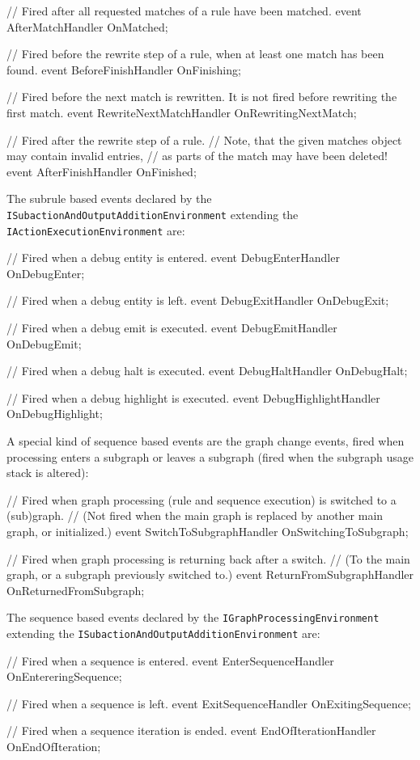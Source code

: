 \begin{csharplet}
// Fired after all requested matches of a rule have been matched.
event AfterMatchHandler OnMatched;

// Fired before the rewrite step of a rule, when at least one match has been found.
event BeforeFinishHandler OnFinishing;

// Fired before the next match is rewritten. It is not fired before rewriting the first match.
event RewriteNextMatchHandler OnRewritingNextMatch;

// Fired after the rewrite step of a rule.
// Note, that the given matches object may contain invalid entries,
// as parts of the match may have been deleted!
event AfterFinishHandler OnFinished;
\end{csharplet}

The subrule based events declared by the \texttt{ISubactionAndOutputAdditionEnvironment} extending the \texttt{IActionExecutionEnvironment} are:

\begin{csharplet}
// Fired when a debug entity is entered.
event DebugEnterHandler OnDebugEnter;

// Fired when a debug entity is left.
event DebugExitHandler OnDebugExit;

// Fired when a debug emit is executed.
event DebugEmitHandler OnDebugEmit;

// Fired when a debug halt is executed.
event DebugHaltHandler OnDebugHalt;

// Fired when a debug highlight is executed.
event DebugHighlightHandler OnDebugHighlight;
\end{csharplet}

A special kind of sequence based events are the graph change events, fired when processing enters a subgraph or leaves a subgraph (fired when the subgraph usage stack is altered):

\begin{csharplet}
// Fired when graph processing (rule and sequence execution) is switched to a (sub)graph.
// (Not fired when the main graph is replaced by another main graph, or initialized.)
event SwitchToSubgraphHandler OnSwitchingToSubgraph;

// Fired when graph processing is returning back after a switch.
// (To the main graph, or a subgraph previously switched to.)
event ReturnFromSubgraphHandler OnReturnedFromSubgraph;
\end{csharplet}

The sequence based events declared by the \texttt{IGraphProcessingEnvironment} extending the \texttt{ISubactionAndOutputAdditionEnvironment} are:
         
\begin{csharplet}
// Fired when a sequence is entered.
event EnterSequenceHandler OnEntereringSequence;

// Fired when a sequence is left.
event ExitSequenceHandler OnExitingSequence;

// Fired when a sequence iteration is ended.
event EndOfIterationHandler OnEndOfIteration;
\end{csharplet}
